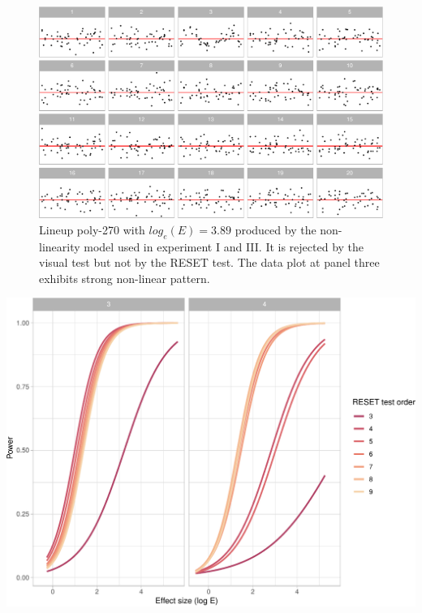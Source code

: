 \documentclass[]{interact}
\theoremstyle{plain}%
\theoremstyle{definition}
\theoremstyle{remark}
\begin{document}
\begin{figure}

{\centering \includegraphics[width=1\linewidth]{paper_comparison_files/figure-latex/poly-example-1} 

}

\caption{Lineup poly-270 with $log_e(E) = 3.89$ produced by the non-linearity model used in experiment I and III. It is rejected by the visual test but not by the RESET test. The data plot at panel three exhibits strong non-linear pattern.}\label{fig:poly-example}
\end{figure}

\begin{center}\includegraphics[width=1\linewidth]{paper_comparison_files/figure-latex/unnamed-chunk-11-1} \end{center}
\end{document}
